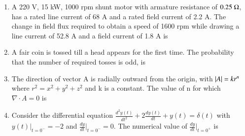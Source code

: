 \documentclass[journal,12pt,onecolumn]{IEEEtran}
\theoremstyle{remark}
\begin{document}
\begin{enumerate}[start=1, label=Q.\arabic*]
\item A 220 V, 15 kW, 1000 rpm shunt motor with armature resistance of $0.25~\ohm$, has a rated line current of 68 A and a rated field current of 2.2 A. The change in field flux required to obtain a speed of 1600 rpm while drawing a line current of 52.8 A and a field current of 1.8 A is

\begin{enumerate}
\end{enumerate}
\hfill{}

\item A fair coin is tossed till a head appears for the first time. The probability that the number of required tosses is odd, is

\begin{enumerate}
\end{enumerate}
\hfill{}

\item The direction of vector A is radially outward from the origin, with $\left\vert A\right\vert=k r^{n}$ where $r^{2}=x^{2}+y^{2}+z^{2}$ and k is a constant. The value of n for which $\nabla\cdot A=0$ is

\begin{enumerate}
\end{enumerate}
\hfill{}

\item Consider the differential equation $\frac{d^{2}y(t)}{dt^{2}}+2\frac{dy(t)}{dt}+y(t)=\delta(t)$ with $y(t)|_{t=0^{-}}=-2$ and $\frac{dy}{dt}|_{t=0^{-}}=0$. The numerical value of $\frac{dy}{dt}|_{t=0^{+}}$ is


\end{enumerate}
\end{document}
